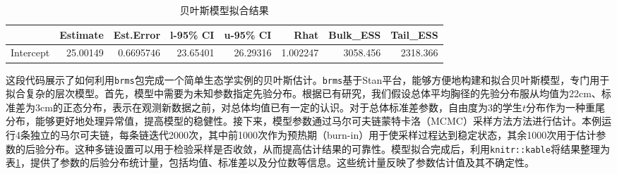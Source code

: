 \documentclass[
  twoside,12pt,fontset=none]{ctexbook}
\newenvironment{Shaded}{\begin{snugshade}}{\end{snugshade}}
\newcommand{\CommentTok}[1]{\textcolor[rgb]{0.56,0.35,0.01}{\textit{#1}}}
\newcommand{\DecValTok}[1]{\textcolor[rgb]{0.00,0.00,0.81}{#1}}
\newcommand{\FunctionTok}[1]{\textcolor[rgb]{0.13,0.29,0.53}{\textbf{#1}}}
\newcommand{\NormalTok}[1]{#1}
\newcommand{\OtherTok}[1]{\textcolor[rgb]{0.56,0.35,0.01}{#1}}
\newcommand{\SpecialCharTok}[1]{\textcolor[rgb]{0.81,0.36,0.00}{\textbf{#1}}}
\newcommand{\StringTok}[1]{\textcolor[rgb]{0.31,0.60,0.02}{#1}}
\begin{document}
\begin{table}[!h]
\centering
\caption{\label{tab:bayesian-estimation-example}贝叶斯模型拟合结果}
\centering
\begin{tabular}[t]{lrrrrrrr}
\toprule
  & Estimate & Est.Error & l-95\% CI & u-95\% CI & Rhat & Bulk\_ESS & Tail\_ESS\\
\midrule
Intercept & 25.00149 & 0.6695746 & 23.65401 & 26.29316 & 1.002247 & 3058.456 & 2318.366\\
\bottomrule
\end{tabular}
\end{table}

这段代码展示了如何利用\texttt{brms}包完成一个简单生态学实例的贝叶斯估计。\texttt{brms}基于Stan平台，能够方便地构建和拟合贝叶斯模型，专门用于拟合复杂的层次模型。首先，模型中需要为未知参数指定先验分布。根据已有研究，我们假设总体平均胸径的先验分布服从均值为22cm、标准差为3cm的正态分布，表示在观测新数据之前，对总体均值已有一定的认识。对于总体标准差参数，自由度为3的学生\(t\)分布作为一种重尾分布，能够更好地处理异常值，提高模型的稳健性。接下来，模型参数通过马尔可夫链蒙特卡洛（MCMC）采样方法方法进行估计。本例运行4条独立的马尔可夫链，每条链迭代2000次，其中前1000次作为预热期（burn-in）用于使采样过程达到稳定状态，其余1000次用于估计参数的后验分布。这种多链设置可以用于检验采样是否收敛，从而提高估计结果的可靠性。模型拟合完成后，利用\texttt{knitr::kable}将结果整理为表\ref{tab:bayesian-estimation-example}，提供了参数的后验分布统计量，包括均值、标准差以及分位数等信息。这些统计量反映了参数估计值及其不确定性。

\begin{Shaded}
\end{Shaded}
\end{document}
